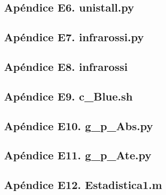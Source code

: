 \subsection{\footnotesize Ap\'endice E6. unistall.py}\label{app:appE6}


\subsection{\footnotesize Ap\'endice E7. infrarossi.py} \label{app:appE7}
 

\subsection{\footnotesize Ap\'endice E8. infrarossi} \label{app:appE8}


\subsection{\footnotesize Ap\'endice E9. c\_Blue.sh}\label{app:appE9}
  
\subsection{\footnotesize Ap\'endice E10. g\_p\_Abs.py}\label{app:appE10}
  

\subsection{\footnotesize Ap\'endice E11. g\_p\_Ate.py}\label{app:appE11}
 

\subsection{\footnotesize Ap\'endice E12. Estadistica1.m}\label{app:appE12}
 


